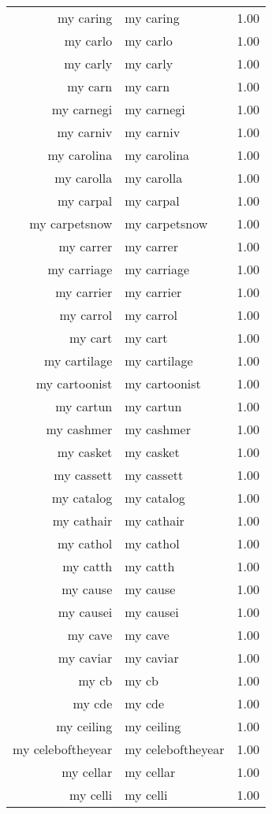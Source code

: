 \begin{table}[ht]
\begin{tabular}{rlr}
  my caring & my caring & 1.00 \\ 
  my carlo & my carlo & 1.00 \\ 
  my carly & my carly & 1.00 \\ 
  my carn & my carn & 1.00 \\ 
  my carnegi & my carnegi & 1.00 \\ 
  my carniv & my carniv & 1.00 \\ 
  my carolina & my carolina & 1.00 \\ 
  my carolla & my carolla & 1.00 \\ 
  my carpal & my carpal & 1.00 \\ 
  my carpetsnow & my carpetsnow & 1.00 \\ 
  my carrer & my carrer & 1.00 \\ 
  my carriage & my carriage & 1.00 \\ 
  my carrier & my carrier & 1.00 \\ 
  my carrol & my carrol & 1.00 \\ 
  my cart & my cart & 1.00 \\ 
  my cartilage & my cartilage & 1.00 \\ 
  my cartoonist & my cartoonist & 1.00 \\ 
  my cartun & my cartun & 1.00 \\ 
  my cashmer & my cashmer & 1.00 \\ 
  my casket & my casket & 1.00 \\ 
  my cassett & my cassett & 1.00 \\ 
  my catalog & my catalog & 1.00 \\ 
  my cathair & my cathair & 1.00 \\ 
  my cathol & my cathol & 1.00 \\ 
  my catth & my catth & 1.00 \\ 
  my cause & my cause & 1.00 \\ 
  my causei & my causei & 1.00 \\ 
  my cave & my cave & 1.00 \\ 
  my caviar & my caviar & 1.00 \\ 
  my cb & my cb & 1.00 \\ 
  my cde & my cde & 1.00 \\ 
  my ceiling & my ceiling & 1.00 \\ 
  my celeboftheyear & my celeboftheyear & 1.00 \\ 
  my cellar & my cellar & 1.00 \\ 
  my celli & my celli & 1.00 \\ 

\end{tabular}
\end{table}
